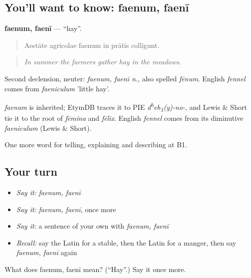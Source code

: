 \subsection*{You'll want to know: faenum, faenī}
\textbf{faenum, faenī} — \textquotedblleft{}hay\textquotedblright{}.

\begin{quote}
Aestāte agricolae faenum in prātīs colligunt.
\end{quote}

\begin{quote}
\emph{In summer the farmers gather hay in the meadows.}
\end{quote}

Second declension, neuter: \emph{faenum, faenī n.}, also spelled \emph{fēnum}. English \emph{fennel} comes from \emph{faeniculum} 'little hay'.

\begin{cousinweb}
\emph{faenum} is inherited; EtymDB traces it to PIE \emph{d\textsuperscript{h}eh\textsubscript{1}(y)-no-}, and Lewis \& Short tie it to the root of \emph{fēmina} and \emph{fēlīx}. English \emph{fennel} comes from its diminutive \emph{faeniculum} (Lewis \& Short).
\end{cousinweb}

\begin{grammarlens}[title={What you've built}]
One more word for telling, explaining and describing at B1.
\end{grammarlens}

\subsection*{Your turn}
\begin{itemize}
\raggedright
  \item \emph{Say it:} \emph{faenum, faenī}
  \item \emph{Say it:} \emph{faenum, faenī}, once more
  \item \emph{Say it:} a sentence of your own with \emph{faenum, faenī}
  \item \emph{Recall:} say the Latin for a stable, then the Latin for a manger, then say \emph{faenum, faenī} again
\end{itemize}

\begin{tcolorbox}[breakable,colback=teal!4,colframe=teal!35!black,title={Before you move on}]
What does faenum, faenī mean? (\textquotedblleft{}Hay\textquotedblright{}.) Say it once more.
\end{tcolorbox}
